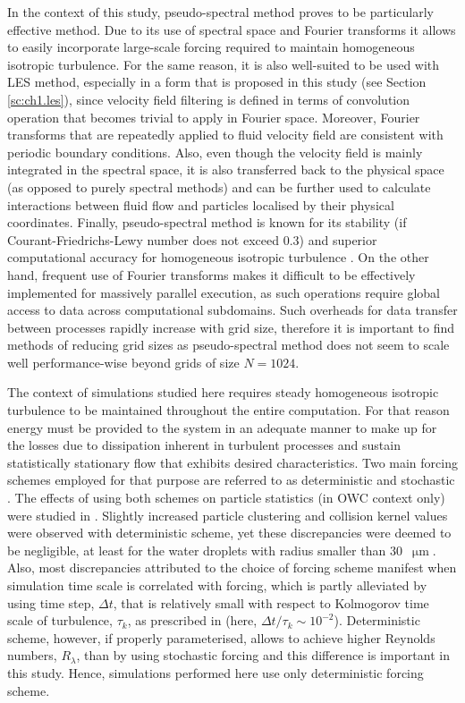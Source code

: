 \documentclass{pracamgren}
\begin{document}
In the context of this study, pseudo-spectral method proves to be particularly effective method.
Due to its use of spectral space and Fourier transforms it allows to easily incorporate large-scale forcing required to maintain homogeneous isotropic turbulence.
For the same reason, it is also well-suited to be used with LES method, especially in a form that is proposed in this study (see Section \ref{sc:ch1.les}), since velocity field filtering is defined in terms of convolution operation that becomes trivial to apply in Fourier space.
Moreover, Fourier transforms that are repeatedly applied to fluid velocity field are consistent with periodic boundary conditions.
Also, even though the velocity field is mainly integrated in the spectral space, it is also transferred back to the physical space (as opposed to purely spectral methods) and can be further used to calculate interactions between fluid flow and particles localised by their physical coordinates.
Finally, pseudo-spectral method is known for its stability (if Courant-Friedrichs-Lewy number does not exceed 0.3) and superior computational accuracy for homogeneous isotropic turbulence \parencite{Peng2009}.
On the other hand, frequent use of Fourier transforms makes it difficult to be effectively implemented for massively parallel execution, as such operations require global access to data across computational subdomains.
Such overheads for data transfer between processes rapidly increase with grid size, therefore it is important to find methods of reducing grid sizes as pseudo-spectral method does not seem to scale well performance-wise beyond grids of size $N=1024$.

\medskip

The context of simulations studied here requires steady homogeneous isotropic turbulence to be maintained throughout the entire computation.
For that reason energy must be provided to the system in an adequate manner to make up for the losses due to dissipation inherent in  turbulent processes and sustain statistically stationary flow that exhibits desired characteristics.
Two main forcing schemes employed for that purpose are referred to as deterministic \parencite{Sullivan1994} and stochastic \parencite{Eswaran1988}. 
The effects of using both schemes on particle statistics (in OWC context only) were studied in \textcite{Rosa2011,Rosa2013,Rosa2015,Parishani2015}.
Slightly increased particle clustering and collision kernel values were observed with deterministic scheme, yet these discrepancies were deemed to be negligible, at least for the water droplets with radius smaller than $30$~$\upmu\text{m}$.
Also, most discrepancies attributed to the choice of forcing scheme manifest when simulation time scale is correlated with forcing, which is partly alleviated by using time step, $\Delta t$, that is relatively small with respect to Kolmogorov time scale of turbulence, $\tau_k$, as prescribed in \textcite{Rosa2015} (here, $\Delta t / \tau_k \sim 10^{-2}$).
Deterministic scheme, however, if properly parameterised, allows to achieve higher Reynolds numbers, $R_{\lambda}$, than by using stochastic forcing and this difference is important in this study.
Hence, simulations performed here use only deterministic forcing scheme.
\end{document}
